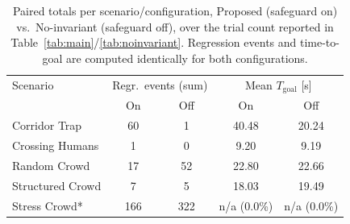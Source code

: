 \begin{table}[h]
\centering
\scriptsize
\caption{Paired totals per scenario/configuration, Proposed (safeguard on) vs.\ No-invariant (safeguard off), over the trial count reported in Table~\ref{tab:main}/\ref{tab:noinvariant}. Regression events and time-to-goal are computed identically for both configurations.}
\label{tab:ablation-detail}
\begin{tabular}{@{}lcccc@{}}
\toprule
Scenario & \multicolumn{2}{c}{Regr.\ events (sum)} & \multicolumn{2}{c}{Mean $T_{\text{goal}}$ [s]} \\
 & On & Off & On & Off \\
\midrule
Corridor Trap & 60 & 1 & 40.48 & 20.24 \\
Crossing Humans & 1 & 0 & 9.20 & 9.19 \\
Random Crowd & 17 & 52 & 22.80 & 22.66 \\
Structured Crowd & 7 & 5 & 18.03 & 19.49 \\
Stress Crowd* & 166 & 322 & n/a (0.0\%) & n/a (0.0\%) \\
\bottomrule
\end{tabular}
\end{table}
